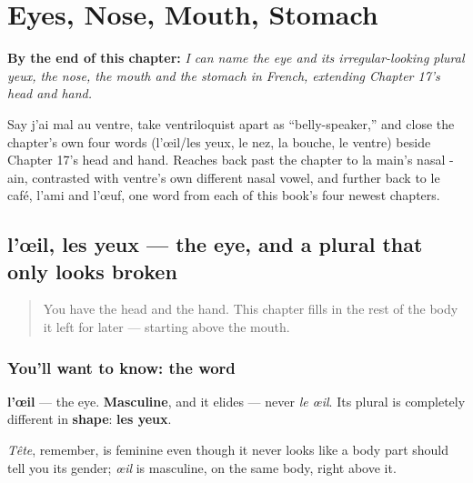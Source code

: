 
\chapter{Eyes, Nose, Mouth, Stomach}
\label{ch:fr-eyes-nose-mouth-stomach}

\begin{chapteropening}
\textbf{By the end of this chapter:} \emph{I can name the eye and its irregular-looking plural yeux, the nose, the mouth and the stomach in French, extending Chapter 17's head and hand.}

Say j'ai mal au ventre, take ventriloquist apart as \textquotedblleft{}belly-speaker,\textquotedblright{} and close the chapter's own four words (l'œil/les yeux, le nez, la bouche, le ventre) beside Chapter 17's head and hand. Reaches back past the chapter to la main's nasal -ain, contrasted with ventre's own different nasal vowel, and further back to le café, l'ami and l'œuf, one word from each of this book's four newest chapters.
\end{chapteropening}

\section[l'œil, les yeux]{l'œil, les yeux — the eye, and a plural that only looks broken}

\label{lesson:FR-C31-oeil}



\begin{quote}
You have the head and the hand. This chapter fills in the rest of the body it left for later — starting above the mouth.
\end{quote}

\subsection*{You'll want to know: the word}
\textbf{l'œil} — the eye. \textbf{Masculine}, and it elides — never \emph{le œil}. Its plural is completely different in \textbf{shape}: \textbf{les yeux}.

\emph{Tête}, remember, is feminine even though it never looks like a body part should tell you its gender; \emph{œil} is masculine, on the same body, right above it.


